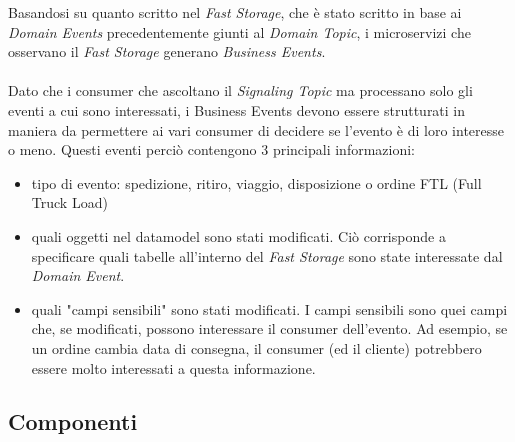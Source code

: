 Basandosi su quanto scritto nel \textit{Fast Storage}, che è stato scritto in base ai \textit{Domain Events} precedentemente giunti al \textit{Domain Topic},
i microservizi che osservano il \textit{Fast Storage} generano \textit{Business Events}.
\\\\
Dato che i consumer che ascoltano il \textit{Signaling Topic} ma processano solo gli eventi a cui sono interessati, 
i Business Events devono essere strutturati in maniera da permettere ai vari consumer di decidere se l'evento è di loro interesse o meno.
Questi eventi perciò contengono 3 principali informazioni:
\begin{itemize}
\item tipo di evento: spedizione, ritiro, viaggio, disposizione o ordine FTL (Full Truck Load)
\item quali oggetti nel datamodel sono stati modificati.
Ciò corrisponde a specificare quali tabelle all'interno del \textit{Fast Storage} sono state interessate dal \textit{Domain Event}.
\item quali "campi sensibili" sono stati modificati.
I campi sensibili sono quei campi che, se modificati, possono interessare il consumer dell'evento.
Ad esempio, se un ordine cambia data di consegna, il consumer (ed il cliente) potrebbero essere molto interessati a questa informazione.
\end{itemize}



\subsection{Componenti}
\label{subsec:components}

